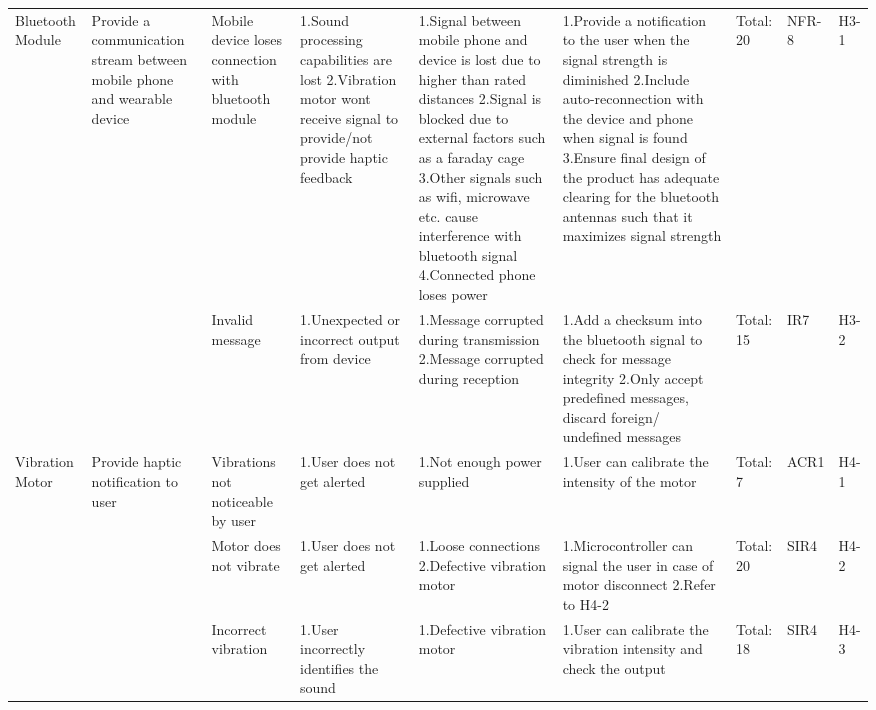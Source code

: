 \documentclass{article}
\begin{document}
\begin{landscape}
\begin{table}[H]
\begin{tabular}{| p{} | p{}  | p{} | p{} | p{} | p{} | p{} | p{} | p{} |}
     Bluetooth Module & Provide a communication stream between mobile phone and wearable device & Mobile device loses connection with  bluetooth module & 1.Sound processing capabilities are lost \newline 2.Vibration motor wont receive signal to provide/not provide haptic feedback  & 1.Signal between mobile phone and  device is lost due to higher than rated distances \newline 2.Signal is blocked due to external factors such as a faraday cage \newline 3.Other signals such as wifi, microwave etc. cause interference with bluetooth signal \newline 4.Connected phone loses power  & 1.Provide a notification to the user when the signal strength is diminished \newline 2.Include auto-reconnection with the device and phone when signal is found \newline 3.Ensure final design of the product has adequate clearing for the bluetooth antennas such that it maximizes signal strength  &  Total: 20 & NFR-8 & H3-1 \\ \cline{3-9}

     & & Invalid message & 1.Unexpected or incorrect output from device & 1.Message corrupted during transmission \newline 2.Message corrupted during reception & 1.Add a checksum into the bluetooth signal to check for message integrity \newline 2.Only accept predefined messages, discard foreign/ undefined messages & Total: 15 & IR7 & H3-2 \\ \hline

     Vibration Motor & Provide haptic notification to user & Vibrations not noticeable by user & 1.User does not get alerted & 1.Not enough power supplied & 1.User can calibrate the intensity of the motor & Total: 7 & ACR1 & H4-1 \\ \cline{3-9}

     & & Motor does not vibrate & 1.User does not get alerted & 1.Loose connections \newline 2.Defective vibration motor  & 1.Microcontroller can signal the user in case of motor disconnect \newline 2.Refer to  H4-2  & Total: 20 & SIR4 & H4-2 \\ \cline{3-9}
 
     & & Incorrect vibration & 1.User incorrectly identifies the sound & 1.Defective vibration motor & 1.User can calibrate the vibration intensity and check the output  & Total: 18 & SIR4 & H4-3 \\ \cline{3-9}
 

\end{tabular}
\end{table}
\end{landscape}
\end{document}
